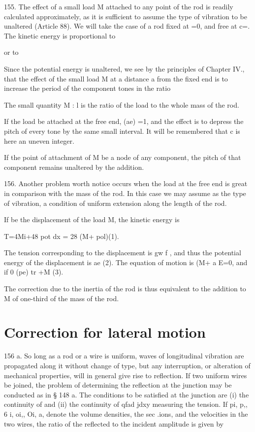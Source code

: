155. The effect of a small load M attached to any point of the rod is
readily calculated approximately, as it is sufficient to assume the
type of vibration to be unaltered (Article 88). We will take the case of
a rod fixed at =0, and free at c=. The kinetic energy is proportional to

or to

Since the potential energy is unaltered, we see by the principles of
Chapter IV., that the effect of the small load M at a distance a from
the fixed end is to increase the period of the component tones in the
ratio

The small quantity M : l is the ratio of the load to the whole mass of
the rod.

If the load be attached at the free end, (ae) =1, and the
effect is to depress the pitch of every tone by the same small interval.
It will be remembered that c is here an uneven integer.

If the point of attachment of M be a node of any component, the pitch of
that component remains unaltered by the addition.

156.  Another problem worth notice occurs when the load at the free end
is great in comparison with the mass of the rod. In this case we may
assume as the type of vibration, a condition of uniform extension along
the length of the rod.

If be the displacement of the load M, the kinetic energy is

T=4Mi+48 pot dx = 28 (M+ pol)(1).

The tension corresponding to the displacement is gw f , and thus the
potential energy of the displacement is ae (2). The equation of motion
is (M+ a E=0, and if 0 (pe) tr +M (3).

The correction due to the inertia of the rod is thus equivalent to the
addition to M of one-third of the mass of the rod.

\section{Correction for lateral motion} \label{sect:156a}
156 a.
So long as a rod or a wire is uniform, waves of longitudinal
vibration are propagated along it without change of type, but any
interruption, or alteration of mechanical properties, will in general
give rise to reflection. If two uniform wires be joined,
the problem of determining the reflection at the junction may be
conducted as in § 148 a. The conditions to be satisfied at the junction
are (i) the continuity of and (ii) the continuity of
qfad jdxy
measuring
the tension. If pi, p,, 6 i, oi,, Oi, a, denote the volume densities,
the sec .ions, and the velocities in the two wires, the ratio of the
reflected to the incident amplitude is given by

